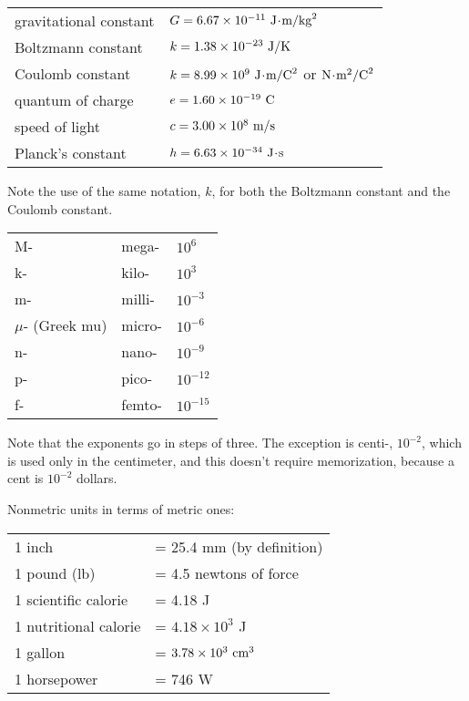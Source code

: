 \noindent\begin{tabular}{|l|l|}
\hline
gravitational constant	& $G=6.67\times10^{-11}\ \junit\unitdot\munit/\kgunit^2$ \\
Boltzmann constant      & $k=1.38\times10^{-23}\ \textup{J}/\textup{K}$\\
Coulomb constant	& $k=8.99\times10^9\ \junit\unitdot\munit/\zu{C}^2$ or $\textup{N}\!\cdot\!\textup{m}^2/\textup{C}^2$ \\
quantum of charge	& $e=1.60\times10^{-19}\ \textup{C}$ \\
speed of light	& $c=3.00\times10^8\ \textup{m/s}$ \\
Planck's constant	& $h=6.63\times10^{-34}\ \junit\unitdot\sunit$ \\
\hline
\end{tabular}\par
\noindent Note the use of the same notation, $k$, for both the Boltzmann constant and the Coulomb constant.


\label{metricprefixestable}
\noindent\begin{tabular}{|l|l|l|}
\hline
M-	& mega-			& $10^6$ \\
k-	& kilo-			& $10^3$ \\
m-	& milli-		& $10^{-3}$ \\
$\mu$- (Greek mu) & micro-	& $10^{-6}$ \\
n-	& nano-			& $10^{-9}$ \\
p-	& pico-			& $10^{-12}$ \\
f-	& femto-		& $10^{-15}$ \\
\hline
\end{tabular}

\noindent{}Note that the exponents go in steps of three.
The exception is centi-, $10^{-2}$, which is used only in the centimeter, and this
doesn't require memorization, because a cent is $10^{-2}$ dollars.

\label{nonmetricunits}
\noindent Nonmetric units in terms of metric ones:\\
\noindent\begin{tabular}{|l|l|}
\hline
1 inch	&= 25.4 mm (by definition)\\
1 pound (lb)	&= 4.5 newtons of force\\
1 scientific calorie &= 4.18 J\\
1 nutritional calorie &= $4.18\times10^3$ J\\
1 gallon &= $3.78\times10^3\ \textup{cm}^3$\\
1 horsepower &= 746 W\\
\hline
\end{tabular}

